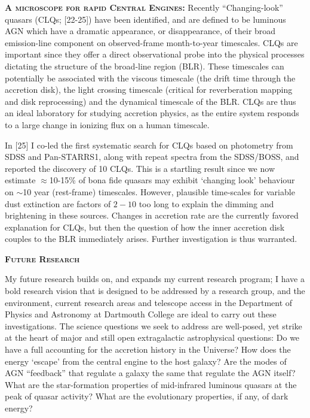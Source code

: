 \documentclass[oneside, a4paper, onecolumn, 11pt]{article}
\begin{document}
\smallskip \smallskip
\smallskip
\smallskip
\noindent
\textbf{\textsc{A microscope for rapid Central Engines:}}
Recently ``Changing-look'' quasars (CLQs; [22-25]) have been
identified, and are defined to be luminous AGN which have a dramatic
appearance, or disappearance, of their broad emission-line component
on observed-frame month-to-year timescales.  CLQs are important since
they offer a direct observational probe into the physical processes
dictating the structure of the broad-line region (BLR). These
timescales can potentially be associated with the viscous timescale
(the drift time through the accretion disk), the light crossing
timescale (critical for reverberation mapping and disk reprocessing)
and the dynamical timescale of the BLR.  CLQs are thus an ideal
laboratory for studying accretion physics, as the entire system
responds to a large change in ionizing flux on a human timescale.

\smallskip \smallskip
\noindent 
In [25] I co-led the first systematic search for CLQs based on
photometry from SDSS and Pan-STARRS1, along with repeat spectra from
the SDSS/BOSS, and reported the discovery of 10 CLQs. This is a
startling result since we now estimate $\approx$10-15\% of bona fide
quasars may exhibit `changing look' behaviour on $\sim$10 year 
(rest-frame) timescales. However, plausible time-scales for variable
dust extinction are factors of $2-10$ too long to explain the dimming
and brightening in these sources.  Changes in accretion rate are the
currently favored explanation for CLQs, but then the question of how
the inner accretion disk couples to the BLR immediately
arises. Further investigation is thus warranted.



\medskip\medskip
\noindent
{\bfseries \large \textsc{\textcolor{Cerulean}{Future Research}}}

\smallskip
\smallskip
\noindent
My future research builds on, and expands my current research program;
I have a bold research vision that is designed to be addressed by a
research group, and the environment, current research areas and
telescope access in the Department of Physics and Astronomy at Dartmouth College
are ideal to
carry out these investigations.
The science questions we seek to address are well-posed, yet strike at
the heart of major and still open extragalactic astrophysical
questions: Do we have a full accounting for the accretion history in
the Universe?  How does the energy `escape' from the central engine to
the host galaxy?  Are the modes of AGN ``feedback'' that regulate a
galaxy the same that regulate the AGN itself?  What are the
star-formation properties of mid-infrared luminous quasars at the peak
of quasar activity?  What are the evolutionary properties, if any, of
dark energy?
\end{document}
